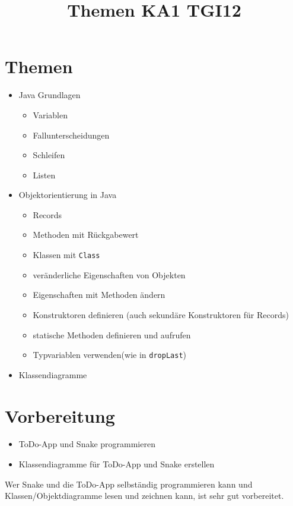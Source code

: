 \documentclass[a4paper,DIV =14]{scrartcl}
\date{}
\title{Themen KA1 TGI12}
\begin{document}
\section{Themen}
\begin{itemize}
\item Java Grundlagen \begin{itemize}
\item Variablen
\item Fallunterscheidungen
\item Schleifen
\item Listen
\end{itemize}
\item Objektorientierung in Java\begin{itemize}
\item Records
\item Methoden mit Rückgabewert
\item Klassen mit \texttt{Class}
\item veränderliche Eigenschaften von Objekten
\item Eigenschaften mit Methoden ändern
\item Konstruktoren definieren (auch sekundäre Konstruktoren für Records)
\item statische Methoden definieren und aufrufen
\item Typvariablen verwenden(wie in \texttt{dropLast})
\end{itemize}

\item Klassendiagramme
\end{itemize}

\section{Vorbereitung}

\begin{itemize}
\item ToDo-App und Snake programmieren
\item Klassendiagramme für ToDo-App und Snake erstellen
\end{itemize}

Wer Snake und die ToDo-App selbständig programmieren kann und Klassen/Objektdiagramme lesen und zeichnen kann, ist sehr gut vorbereitet.
\end{document}
